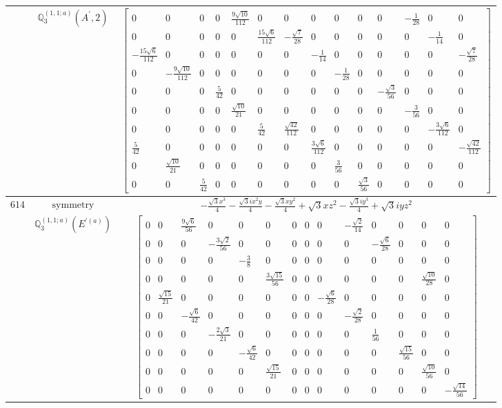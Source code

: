 \documentclass[fleqn,8pt,landscape]{jsarticle}
\begin{document}
\begin{longtable}{ccc}
$  $ & $ \mathbb{Q}_{3}^{(1,1;a)}(A^{\prime},2) $ & $ \begin{bmatrix} 0 & 0 & 0 & 0 & \frac{9 \sqrt{10}}{112} & 0 & 0 & 0 & 0 & 0 & 0 & - \frac{1}{28} & 0 & 0 \\ 0 & 0 & 0 & 0 & 0 & \frac{15 \sqrt{6}}{112} & - \frac{\sqrt{7}}{28} & 0 & 0 & 0 & 0 & 0 & - \frac{1}{14} & 0 \\ - \frac{15 \sqrt{6}}{112} & 0 & 0 & 0 & 0 & 0 & 0 & - \frac{1}{14} & 0 & 0 & 0 & 0 & 0 & - \frac{\sqrt{7}}{28} \\ 0 & - \frac{9 \sqrt{10}}{112} & 0 & 0 & 0 & 0 & 0 & 0 & - \frac{1}{28} & 0 & 0 & 0 & 0 & 0 \\ 0 & 0 & 0 & \frac{5}{42} & 0 & 0 & 0 & 0 & 0 & 0 & - \frac{\sqrt{3}}{56} & 0 & 0 & 0 \\ 0 & 0 & 0 & 0 & \frac{\sqrt{10}}{21} & 0 & 0 & 0 & 0 & 0 & 0 & - \frac{3}{56} & 0 & 0 \\ 0 & 0 & 0 & 0 & 0 & \frac{5}{42} & \frac{\sqrt{42}}{112} & 0 & 0 & 0 & 0 & 0 & - \frac{3 \sqrt{6}}{112} & 0 \\ \frac{5}{42} & 0 & 0 & 0 & 0 & 0 & 0 & \frac{3 \sqrt{6}}{112} & 0 & 0 & 0 & 0 & 0 & - \frac{\sqrt{42}}{112} \\ 0 & \frac{\sqrt{10}}{21} & 0 & 0 & 0 & 0 & 0 & 0 & \frac{3}{56} & 0 & 0 & 0 & 0 & 0 \\ 0 & 0 & \frac{5}{42} & 0 & 0 & 0 & 0 & 0 & 0 & \frac{\sqrt{3}}{56} & 0 & 0 & 0 & 0 \end{bmatrix} $ \\ \hline
$ 614 $ & $ \text{symmetry} $ & $ - \frac{\sqrt{3} x^{3}}{4} - \frac{\sqrt{3} i x^{2} y}{4} - \frac{\sqrt{3} x y^{2}}{4} + \sqrt{3} x z^{2} - \frac{\sqrt{3} i y^{3}}{4} + \sqrt{3} i y z^{2} $ \\
$  $ & $ \mathbb{Q}_{3}^{(1,1;a)}(E^{\prime(a)}) $ & $ \begin{bmatrix} 0 & 0 & \frac{9 \sqrt{6}}{56} & 0 & 0 & 0 & 0 & 0 & 0 & - \frac{\sqrt{2}}{14} & 0 & 0 & 0 & 0 \\ 0 & 0 & 0 & - \frac{3 \sqrt{2}}{56} & 0 & 0 & 0 & 0 & 0 & 0 & - \frac{\sqrt{6}}{28} & 0 & 0 & 0 \\ 0 & 0 & 0 & 0 & - \frac{3}{8} & 0 & 0 & 0 & 0 & 0 & 0 & 0 & 0 & 0 \\ 0 & 0 & 0 & 0 & 0 & \frac{3 \sqrt{15}}{56} & 0 & 0 & 0 & 0 & 0 & 0 & \frac{\sqrt{10}}{28} & 0 \\ 0 & \frac{\sqrt{15}}{21} & 0 & 0 & 0 & 0 & 0 & 0 & - \frac{\sqrt{6}}{28} & 0 & 0 & 0 & 0 & 0 \\ 0 & 0 & - \frac{\sqrt{6}}{42} & 0 & 0 & 0 & 0 & 0 & 0 & - \frac{\sqrt{2}}{28} & 0 & 0 & 0 & 0 \\ 0 & 0 & 0 & - \frac{2 \sqrt{3}}{21} & 0 & 0 & 0 & 0 & 0 & 0 & \frac{1}{56} & 0 & 0 & 0 \\ 0 & 0 & 0 & 0 & - \frac{\sqrt{6}}{42} & 0 & 0 & 0 & 0 & 0 & 0 & \frac{\sqrt{15}}{56} & 0 & 0 \\ 0 & 0 & 0 & 0 & 0 & \frac{\sqrt{15}}{21} & 0 & 0 & 0 & 0 & 0 & 0 & \frac{\sqrt{10}}{56} & 0 \\ 0 & 0 & 0 & 0 & 0 & 0 & 0 & 0 & 0 & 0 & 0 & 0 & 0 & - \frac{\sqrt{14}}{56} \end{bmatrix} $ \\ \hline

\end{longtable}
\end{document}
